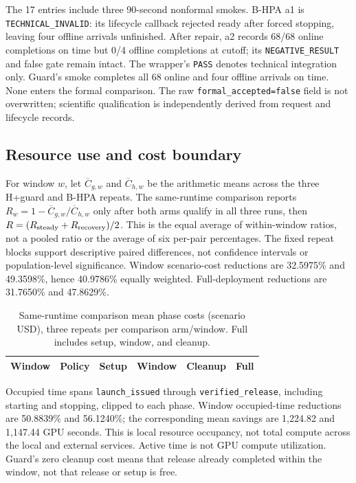 The 17 entries include three 90-second nonformal smokes.
B-HPA a1 is \texttt{TECHNICAL\_INVALID}: its lifecycle callback rejected
ready after forced stopping, leaving four offline arrivals unfinished.
After repair, a2 records 68/68 online completions on time but 0/4 offline
completions at cutoff; its \texttt{NEGATIVE\_RESULT} and false gate remain intact.
The wrapper's \texttt{PASS} denotes technical integration only.
Guard's smoke completes all 68 online and four offline arrivals on time.
None enters the formal comparison. The raw \texttt{formal\_accepted=false}
field is not overwritten; scientific qualification is independently derived from
request and lifecycle records.

\subsection{Resource use and cost boundary}
For window $w$, let $\overline C_{g,w}$ and $\overline C_{h,w}$ be the arithmetic
means across the three H+guard and B-HPA repeats. The same-runtime comparison reports
$R_w=1-\overline C_{g,w}/\overline C_{h,w}$ only after both arms qualify in
all three runs, then $R=(R_{\rm steady}+R_{\rm recovery})/2$.
This is the equal average of within-window ratios, not a pooled ratio or the
average of six per-pair percentages. The fixed repeat blocks support descriptive
paired differences, not confidence intervals or population-level significance.
Window scenario-cost reductions are 32.5975\% and 49.3598\%, hence 40.9786\%
equally weighted. Full-deployment reductions are 31.7650\% and 47.8629\%.

\begin{table}[t]
\centering
\small
\caption{Same-runtime comparison mean phase costs (scenario USD), three repeats per comparison
arm/window. Full includes setup, window, and cleanup.}
\label{tab:e1phases}
\setlength{\tabcolsep}{2pt}
\par\vspace{4pt}
\begin{tabular*}{\linewidth}{@{\extracolsep{\fill}}llrrrr@{}}
\toprule
Window & Policy & Setup & Window & Cleanup & Full\\
\midrule

\end{tabular*}
\end{table}

Occupied time spans \texttt{launch\_issued} through \texttt{verified\_release},
including starting and stopping, clipped to each phase. Window occupied-time
reductions are 50.8839\% and 56.1240\%; the corresponding mean savings are
1,224.82 and 1,147.44 GPU seconds. This is local resource occupancy, not total
compute across the local and external services. Active time is not GPU compute
utilization. Guard's zero cleanup cost means that release already completed
within the window, not that release or setup is free.

